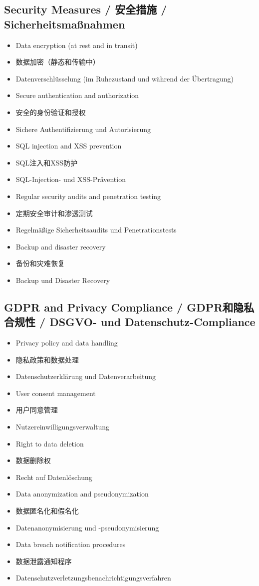 \subsection{Security Measures / 安全措施 / Sicherheitsmaßnahmen}
\begin{itemize}
    \item Data encryption (at rest and in transit)
    \item 数据加密（静态和传输中）
    \item Datenverschlüsselung (im Ruhezustand und während der Übertragung)
    \item Secure authentication and authorization
    \item 安全的身份验证和授权
    \item Sichere Authentifizierung und Autorisierung
    \item SQL injection and XSS prevention
    \item SQL注入和XSS防护
    \item SQL-Injection- und XSS-Prävention
    \item Regular security audits and penetration testing
    \item 定期安全审计和渗透测试
    \item Regelmäßige Sicherheitsaudits und Penetrationstests
    \item Backup and disaster recovery
    \item 备份和灾难恢复
    \item Backup und Disaster Recovery
\end{itemize}

\subsection{GDPR and Privacy Compliance / GDPR和隐私合规性 / DSGVO- und Datenschutz-Compliance}
\begin{itemize}
    \item Privacy policy and data handling
    \item 隐私政策和数据处理
    \item Datenschutzerklärung und Datenverarbeitung
    \item User consent management
    \item 用户同意管理
    \item Nutzereinwilligungsverwaltung
    \item Right to data deletion
    \item 数据删除权
    \item Recht auf Datenlöschung
    \item Data anonymization and pseudonymization
    \item 数据匿名化和假名化
    \item Datenanonymisierung und -pseudonymisierung
    \item Data breach notification procedures
    \item 数据泄露通知程序
    \item Datenschutzverletzungsbenachrichtigungsverfahren
\end{itemize}

